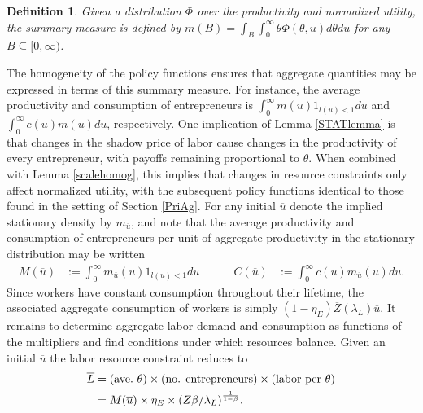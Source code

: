 \documentclass[11pt]{article}
\theoremstyle{plain}
\newtheorem{defn}{Definition}[section]
\begin{document}
\begin{defn}\label{summary_m}
Given a distribution $\Phi$ over the productivity and normalized utility, the summary measure is defined by $m(B) = \int_{B}\int_{0}^{\infty} \theta\Phi(\theta,u) d\theta du$ for any $B \subseteq [0, \infty)$.
\end{defn} 

The homogeneity of the policy functions ensures that aggregate quantities may be expressed in terms of this summary measure. For instance, the average productivity and consumption of entrepreneurs is $\int_{0}^{\infty}m(u)1_{l(u)<1} du$ and $\int_{0}^{\infty}c(u)m(u) du$, respectively. One implication of Lemma \ref{STATlemma} is that changes in the shadow price of labor cause changes in the productivity of every entrepreneur, with payoffs remaining proportional to $\theta$. When combined with Lemma \ref{scalehomog}, this implies that changes in resource constraints only affect normalized utility, with the subsequent policy functions identical to those found in the setting of Section \ref{PriAg}. For any initial $\overline{u}$ denote the implied stationary density by $m_{\overline{u}}$, and note that the average productivity and consumption of entrepreneurs per unit of aggregate productivity in the stationary distribution may be written
\begin{equation}
\begin{aligned}
M(\overline{u}) & := \int_{0}^{\infty}m_{\overline{u}}(u)1_{l(u)<1}du \ \ \ \ \ & \ \ \ \ \
C(\overline{u}) & := \int_{0}^{\infty}c(u)m_{\overline{u}}(u)du.
\label{Output}
\end{aligned}
\end{equation} 
Since workers have constant consumption throughout their lifetime, the associated aggregate consumption of workers is simply $(1-\eta_E)\overline{Z}(\lambda_L)\overline{u}$. It remains to determine aggregate labor demand and consumption as functions of the multipliers and find conditions under which resources balance. Given an initial $\overline{u}$ the labor resource constraint reduces to
\begin{equation}
\begin{aligned}
\overline{L} & = (\textnormal{ave.} \ \theta) \times \textnormal{(no. entrepreneurs)} \times \textnormal{(labor per $\theta$)}
\\ & = M(\overline{u}) \times \eta_E \times {\left(Z\beta/\lambda_L\right)}^{\frac{1}{1-\beta}}.
\end{aligned}
\label{LRcons7}
\end{equation}
\end{document}
